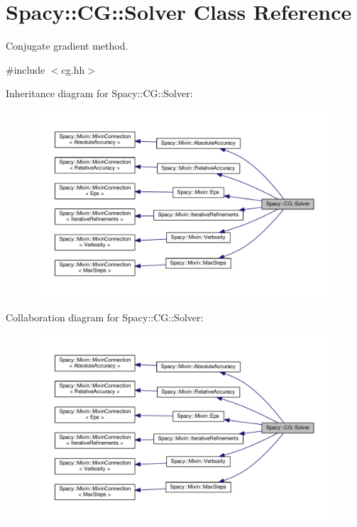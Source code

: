 \hypertarget{classSpacy_1_1CG_1_1Solver}{}\section{Spacy\+:\+:C\+G\+:\+:Solver Class Reference}
\label{classSpacy_1_1CG_1_1Solver}


Conjugate gradient method.  




{\ttfamily \#include $<$cg.\+hh$>$}



Inheritance diagram for Spacy\+:\+:C\+G\+:\+:Solver\+:\nopagebreak
\begin{figure}[H]
\begin{center}
\leavevmode
\includegraphics[width=350pt]{classSpacy_1_1CG_1_1Solver__inherit__graph}
\end{center}
\end{figure}


Collaboration diagram for Spacy\+:\+:C\+G\+:\+:Solver\+:\nopagebreak
\begin{figure}[H]
\begin{center}
\leavevmode
\includegraphics[width=350pt]{classSpacy_1_1CG_1_1Solver__coll__graph}
\end{center}
\end{figure}
